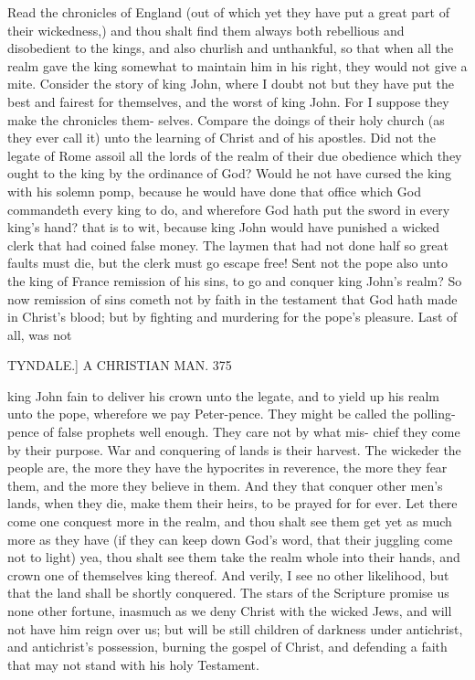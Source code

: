 \documentclass{custom}
\begin{document}
{Read the chronicles of England (out of which yet they 
have put a great part of their wickedness,) and thou shalt 
find them always both rebellious and disobedient to the 
kings, and also churlish and unthankful, so that when all 
the realm gave the king somewhat to maintain him in his 
right, they would not give a mite. Consider the story 
of king John, where I doubt not but they have put the 
best and fairest for themselves, and the worst of king 
John. For I suppose they make the chronicles them- 
selves. Compare the doings of their holy church (as they 
ever call it) unto the learning of Christ and of his apostles. 
Did not the legate of Rome assoil all the lords of the 
realm of their due obedience which they ought to the 
king by the ordinance of God? Would he not have 
cursed the king with his solemn pomp, because he would 
have done that office which God commandeth every king 
to do, and wherefore God hath put the sword in every 
king's hand? that is to wit, because king John would 
have punished a wicked clerk that had coined false 
money. The laymen that had not done half so great 
faults must die, but the clerk must go escape free! Sent 
not the pope also unto the king of France remission of 
his sins, to go and conquer king John's realm? So now 
remission of sins cometh not by faith in the testament that 
God hath made in Christ's blood; but by fighting and 
murdering for the pope's pleasure. Last of all, was not 


TYNDALE.] A CHRISTIAN MAN. 375

king John fain to deliver his crown unto the legate, and 
to yield up his realm unto the pope, wherefore we pay 
Peter-pence. They might be called the polling-pence of 
false prophets well enough. They care not by what mis- 
chief they come by their purpose. War and conquering 
of lands is their harvest. The wickeder the people are, 
the more they have the hypocrites in reverence, the more 
they fear them, and the more they believe in them. And 
they that conquer other men's lands, when they die, make 
them their heirs, to be prayed for for ever. Let there come
one conquest more in the realm, and thou shalt see them
get yet as much more as they have (if they can keep down
God's word, that their juggling come not to light) yea,
thou shalt see them take the realm whole into their hands,
and crown one of themselves king thereof. And verily, 
I see no other likelihood, but that the land shall be shortly 
conquered. The stars of the Scripture promise us none 
other fortune, inasmuch as we deny Christ with the wicked 
Jews, and will not have him reign over us; but will be 
still children of darkness under antichrist, and antichrist's 
possession, burning the gospel of Christ, and defending 
a faith that may not stand with his holy Testament. 

}
\end{document}
